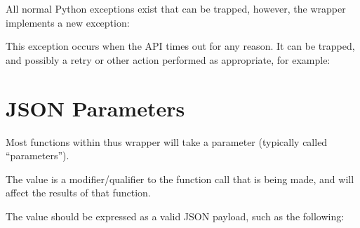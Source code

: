 \documentclass[letterpaper,10pt,english]{sphinxmanual}
\begin{document}
All normal Python exceptions exist that can be trapped, however, the wrapper implements a new exception:

\begin{sphinxVerbatim}[commandchars=\\\{\}]
\end{sphinxVerbatim}

This exception occurs when the API times out for any reason. It can be trapped, and possibly a retry or other action
performed as appropriate, for example:

\begin{sphinxVerbatim}[commandchars=\\\{\}]
      
 
\end{sphinxVerbatim}


\chapter{JSON Parameters}
\label{\detokenize{details/useful/jsonpayload:json-parameters}}\label{\detokenize{details/useful/jsonpayload::doc}}
Most functions within thus wrapper will take a parameter (typically called “parameters”).

The value is a modifier/qualifier to the function call that is being made, and will affect the results of that function.

The value should be expressed as a valid JSON payload, such as the following:

\begin{sphinxVerbatim}[commandchars=\\\{\}]
\end{sphinxVerbatim}
\end{document}
